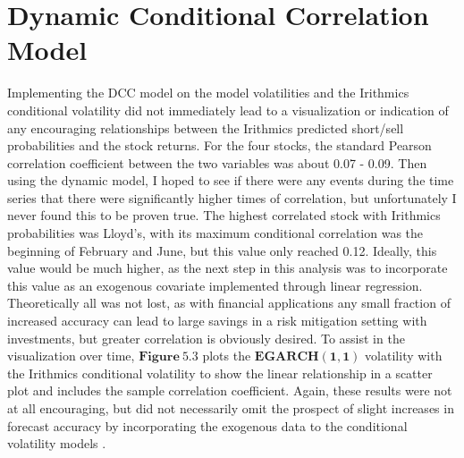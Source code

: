 \section{Dynamic Conditional Correlation Model}
Implementing the DCC model on the model volatilities and the Irithmics conditional volatility did not immediately lead to a visualization or indication of any encouraging relationships between the Irithmics predicted short/sell probabilities and the stock returns. For the four stocks, the standard Pearson correlation coefficient between the two variables was about 0.07 - 0.09. Then using the dynamic model, I hoped to see if there were any events during the time series that there were significantly higher times of correlation, but unfortunately I never found this to be proven true. The highest correlated stock with Irithmics probabilities was Lloyd's, with its maximum conditional correlation was the beginning of February and June, but this value only reached 0.12. Ideally, this value would be much higher, as the next step in this analysis was to incorporate this value as an exogenous covariate implemented through linear regression. Theoretically all was not lost, as with financial applications any small fraction of increased accuracy can lead to large savings in a risk mitigation setting with investments, but greater correlation is obviously desired. To assist in the visualization over time, $\mathbf{Figure~5.3}$ plots the $\mathbf{EGARCH(1,1)}$ volatility with the Irithmics conditional volatility to show the linear relationship in a scatter plot and includes the sample correlation coefficient. Again, these results were not at all encouraging, but did not necessarily omit the prospect of slight increases in forecast accuracy by incorporating the exogenous data to the conditional volatility models \cite{DirtyQuant}. 


